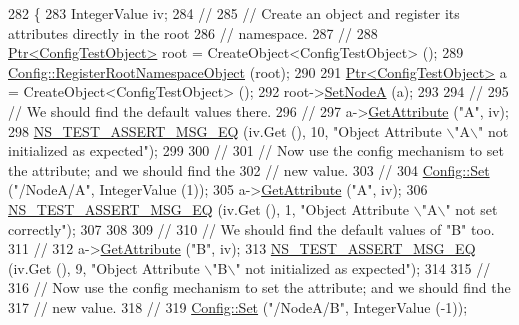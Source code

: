 \begin{DoxyCode}
282 \{
283   IntegerValue iv;
284   \textcolor{comment}{//}
285   \textcolor{comment}{// Create an object and register its attributes directly in the root }
286   \textcolor{comment}{// namespace.}
287   \textcolor{comment}{//}
288   \hyperlink{classns3_1_1Ptr}{Ptr<ConfigTestObject>} root = CreateObject<ConfigTestObject> ();
289   \hyperlink{group__config_gadf663c596f54bed678e83cccd4e3d9d5}{Config::RegisterRootNamespaceObject} (root);
290 
291   \hyperlink{classns3_1_1Ptr}{Ptr<ConfigTestObject>} a = CreateObject<ConfigTestObject> ();
292   root->\hyperlink{classConfigTestObject_aa1f3fc0f4e345021d93d6f3704eae58a}{SetNodeA} (a);
293 
294   \textcolor{comment}{//}
295   \textcolor{comment}{// We should find the default values there.}
296   \textcolor{comment}{//}
297   a->\hyperlink{classns3_1_1ObjectBase_a895d1de2f96063d0e0fd78463e7a7e30}{GetAttribute} (\textcolor{stringliteral}{"A"}, iv);
298   \hyperlink{group__testing_ga2a9d78cffb3db8e867c35fff0b698cf5}{NS\_TEST\_ASSERT\_MSG\_EQ} (iv.Get (), 10, \textcolor{stringliteral}{"Object Attribute \(\backslash\)"A\(\backslash\)" not initialized as
       expected"});
299 
300   \textcolor{comment}{//}
301   \textcolor{comment}{// Now use the config mechanism to set the attribute; and we should find the}
302   \textcolor{comment}{// new value.}
303   \textcolor{comment}{//}
304   \hyperlink{group__config_gadce03667ec621d64ce4aace85d9bcfd0}{Config::Set} (\textcolor{stringliteral}{"/NodeA/A"}, IntegerValue (1));
305   a->\hyperlink{classns3_1_1ObjectBase_a895d1de2f96063d0e0fd78463e7a7e30}{GetAttribute} (\textcolor{stringliteral}{"A"}, iv);
306   \hyperlink{group__testing_ga2a9d78cffb3db8e867c35fff0b698cf5}{NS\_TEST\_ASSERT\_MSG\_EQ} (iv.Get (), 1, \textcolor{stringliteral}{"Object Attribute \(\backslash\)"A\(\backslash\)" not set correctly"});
307 
308 
309   \textcolor{comment}{//}
310   \textcolor{comment}{// We should find the default values of "B" too.}
311   \textcolor{comment}{//}
312   a->\hyperlink{classns3_1_1ObjectBase_a895d1de2f96063d0e0fd78463e7a7e30}{GetAttribute} (\textcolor{stringliteral}{"B"}, iv);
313   \hyperlink{group__testing_ga2a9d78cffb3db8e867c35fff0b698cf5}{NS\_TEST\_ASSERT\_MSG\_EQ} (iv.Get (), 9, \textcolor{stringliteral}{"Object Attribute \(\backslash\)"B\(\backslash\)" not initialized as
       expected"});
314 
315   \textcolor{comment}{//}
316   \textcolor{comment}{// Now use the config mechanism to set the attribute; and we should find the}
317   \textcolor{comment}{// new value.}
318   \textcolor{comment}{//}
319   \hyperlink{group__config_gadce03667ec621d64ce4aace85d9bcfd0}{Config::Set} (\textcolor{stringliteral}{"/NodeA/B"}, IntegerValue (-1));

\end{DoxyCode}
